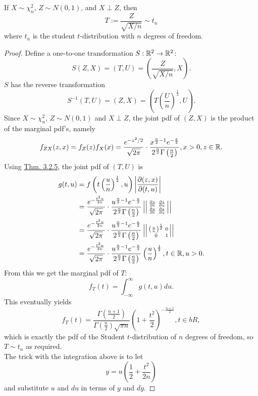 \documentclass[11pt,fleqn]{book} %
\begin{document}
\begin{lemma} \label{lemma:339}
If \(X \sim \chi^2_n\), \(Z \sim N(0, 1)\), and \(X \perp Z\), then
\[
T := \frac{Z}{\sqrt{X / n}} \sim t_n
\]
where \(t_n\) is the student \(t\)-distribution with \(n\) degrees of freedom.
\end{lemma}
\begin{proof}
Define a one-to-one transformation \(S:\mathbb{R}^2 \rightarrow\mathbb{R}^2\):
\[
S(Z, X) = (T, U) = \left(\frac{Z}{\sqrt{X / n}}, X\right).
\]
\indent \(S\) has the reverse transformation
\[
S^{-1}(T, U) = (Z, X) = \left(T\left(\frac{U}{n}\right)^{\frac12}, U\right).
\]
\indent Since \(X \sim \chi^2_n\), \(Z \sim N(0, 1)\) and \(X \perp Z\), the joint pdf of \((Z, X)\) is the product of the marginal pdf's, namely
\[
f_{ZX}(z, x) = f_Z(z)f_X(x) = \frac{e^{-z^2/2}}{\sqrt{2\pi}}\cdot\frac{x^{\frac{n}{2}-1}e^{-\frac{x}{2}}}{2^{\frac{n}{2}}\Gamma\left(\frac{n}{2}\right)}, x > 0, z \in \mathbb{R}.
\]
\indent Using \hyperref[thm:325]{Thm. 3.2.5}, the joint pdf of \((T, U)\) is
\[
\begin{aligned}
g(t, u) &= f\left(t\left(\frac{u}{n}\right)^{\frac12}, u\right)\left|\frac{\partial(z, x)}{\partial(t, u)}\right| \\
&= \frac{e^{-\frac{t^2u}{2n}}}{\sqrt{2\pi}}\cdot\frac{u^{\frac{n}{2}-1}e^{-\frac{u}{2}}}{2^{\frac{n}{2}}\Gamma\left(\frac{n}{2}\right)}\left|\left|\begin{smallmatrix} \frac{\partial z}{\partial t} & \frac{\partial z}{\partial u} \\
\frac{\partial x}{\partial t} & \frac{\partial x}{\partial u}\end{smallmatrix}\right|\right| \\
&= \frac{e^{-\frac{t^2u}{2n}}}{\sqrt{2\pi}}\cdot\frac{u^{\frac{n}{2}-1}e^{-\frac{u}{2}}}{2^{\frac{n}{2}}\Gamma\left(\frac{n}{2}\right)}\left|\left|\begin{smallmatrix} \left(\frac{u}{n}\right)^{\frac12} & 0 \\
0 & 1\end{smallmatrix}\right|\right| \\
&= \frac{e^{-\frac{t^2u}{2n}}}{\sqrt{2\pi}}\cdot\frac{u^{\frac{n}{2}-1}e^{-\frac{u}{2}}}{2^{\frac{n}{2}}\Gamma\left(\frac{n}{2}\right)}\left(\frac{u}{n}\right)^{\frac12}, t \in \mathbb{R}, u > 0.
\end{aligned}
\]
\indent From this we get the marginal pdf of \(T\):
\[
f_T(t) = \int_{-\infty}^\infty g(t, u)du.
\]
\indent This eventually yields
\[
f_T(t) = \frac{\Gamma\left(\frac{n+1}{2}\right)}{\Gamma\left(\frac{n}{2}\right)\sqrt{\pi n}} \left(1 + \frac{t^2}{2}\right)^{-\frac{n+1}{2}}, t \in bR,
\]
which is exactly the pdf of the Student \(t\)-distribution of \(n\) degrees of freedom, so \(T \sim t_n\) as required.\\
\indent The trick with the integration above is to let
\[
y = u\left(\frac12 + \frac{t^2}{2n}\right)
\]
and substitute \(u\) and \(du\) in terms of \(y\) and \(dy\).
\end{proof}
\end{document}
